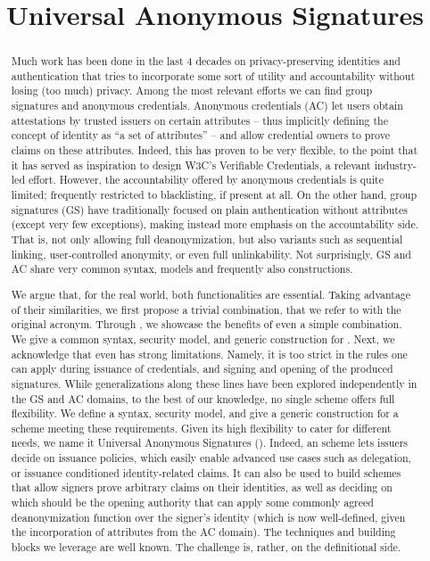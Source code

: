 \documentclass{llncs}%
\title{Universal Anonymous Signatures}
\author{}
\begin{document}
\maketitle


\begin{abstract}
  Much work has been done in the last 4 decades on privacy-preserving
  identities and authentication that tries to incorporate some sort of utility
  and accountability without losing (too much) privacy. Among the most relevant
  efforts we can find group signatures and anonymous credentials.
  Anonymous credentials (AC) let users obtain attestations by trusted
  issuers on certain attributes -- thus implicitly defining the concept of
  identity as ``a set of attributes'' -- and allow credential owners to prove
  claims on these attributes. Indeed, this has proven to be very
  flexible, to the point that it has served as inspiration to design W3C's
  Verifiable Credentials, a relevant industry-led effort. However, the
  accountability offered by anonymous credentials is quite limited; frequently
  restricted to blacklisting, if present at all.
  On the other hand, group signatures (GS) have traditionally focused on plain
  authentication without attributes (except very few exceptions), making instead
  more emphasis on the accountability side. That is, not only allowing full
  deanonymization, but also variants such as sequential linking, user-controlled
  anonymity, or even full unlinkability.
  Not surprisingly, GS and AC share very common syntax, models and frequently
  also constructions.

  We argue that, for the real world, both functionalities are essential. Taking
  advantage of their similarities, we first propose a trivial combination, that
  we refer to with the original \GSAC acronym. Through \GSAC, we
  showcase the benefits of even a simple combination. We give a common syntax,
  security model, and generic construction for \GSAC.
  Next, we acknowledge that even \GSAC has strong limitations. Namely, it is too
  strict in the rules one can apply during issuance of credentials, and signing
  and opening of the produced signatures. While generalizations along these
  lines have been explored independently in the GS and AC domains, to the best
  of our knowledge, no single scheme offers full flexibility.
  We define a syntax, security model, and give a generic
  construction for a scheme meeting these requirements. Given its high
  flexibility to cater for different needs, we name it Universal Anonymous
  Signatures (\UAS). Indeed, an \UAS scheme lets issuers decide on issuance
  policies, which easily enable advanced use cases such as delegation, or
  issuance conditioned identity-related claims. It can also be used to build
  schemes that allow signers prove arbitrary claims on their identities, as well
  as deciding on which should be the opening authority that can apply some
  commonly agreed deanonymization function over the signer's identity (which is
  now well-defined, given the incorporation of attributes from the AC domain).
  The techniques and building blocks we leverage are well known. The challenge
  is, rather, on the definitional side.
\end{abstract}
\end{document}
